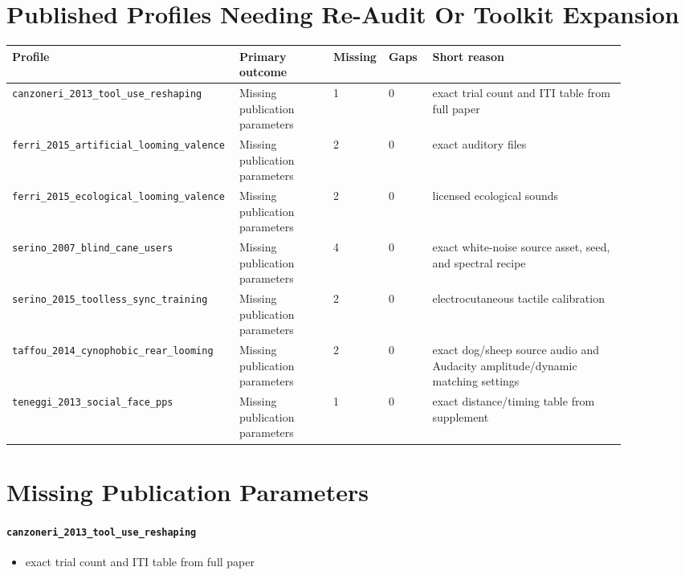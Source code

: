 \documentclass[11pt]{article}
\begin{document}
\section*{Published Profiles Needing Re-Audit Or Toolkit Expansion}
{\footnotesize
\begin{longtable}{>{\raggedright\arraybackslash}p{0.29\linewidth}p{0.15\linewidth}p{0.07\linewidth}p{0.07\linewidth}>{\raggedright\arraybackslash}p{0.31\linewidth}}
\toprule
Profile & Primary outcome & Missing & Gaps & Short reason \\
\midrule
\endhead
\texttt{canzoneri\_\allowbreak{}2013\_\allowbreak{}tool\_\allowbreak{}use\_\allowbreak{}reshaping} & Missing publication parameters & 1 & 0 & exact trial count and ITI table from full paper \\
\texttt{ferri\_\allowbreak{}2015\_\allowbreak{}artificial\_\allowbreak{}looming\_\allowbreak{}valence} & Missing publication parameters & 2 & 0 & exact auditory files \\
\texttt{ferri\_\allowbreak{}2015\_\allowbreak{}ecological\_\allowbreak{}looming\_\allowbreak{}valence} & Missing publication parameters & 2 & 0 & licensed ecological sounds \\
\texttt{serino\_\allowbreak{}2007\_\allowbreak{}blind\_\allowbreak{}cane\_\allowbreak{}users} & Missing publication parameters & 4 & 0 & exact white-noise source asset, seed, and spectral recipe \\
\texttt{serino\_\allowbreak{}2015\_\allowbreak{}toolless\_\allowbreak{}sync\_\allowbreak{}training} & Missing publication parameters & 2 & 0 & electrocutaneous tactile calibration \\
\texttt{taffou\_\allowbreak{}2014\_\allowbreak{}cynophobic\_\allowbreak{}rear\_\allowbreak{}looming} & Missing publication parameters & 2 & 0 & exact dog/sheep source audio and Audacity amplitude/dynamic matching settings \\
\texttt{teneggi\_\allowbreak{}2013\_\allowbreak{}social\_\allowbreak{}face\_\allowbreak{}pps} & Missing publication parameters & 1 & 0 & exact distance/timing table from supplement \\
\bottomrule
\end{longtable}
}

\section*{Missing Publication Parameters}
\paragraph{\texttt{canzoneri\_\allowbreak{}2013\_\allowbreak{}tool\_\allowbreak{}use\_\allowbreak{}reshaping}}
\begin{itemize}
\item exact trial count and ITI table from full paper
\end{itemize}
\end{document}
